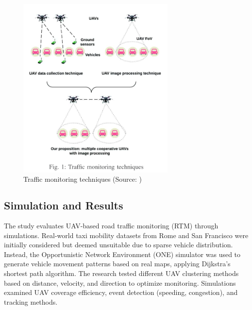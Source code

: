 \begin{figure}[H]
    \centering
    \includegraphics[width=0.7\textwidth]{Figures/Chapter3/Method4/3.png}
    \caption{Traffic monitoring techniques (Source: \cite{elloumi2018monitoring})}
    \label{fig:vehicular_mobility}
\end{figure}

\vspace{\baselineskip} %

\subsection{Simulation and Results}
The study evaluates UAV-based road traffic monitoring (RTM) through simulations. Real-world taxi mobility datasets from Rome and San Francisco were initially considered but deemed unsuitable due to sparse vehicle distribution. Instead, the Opportunistic Network Environment (ONE) simulator was used to generate vehicle movement patterns based on real maps, applying Dijkstra’s shortest path algorithm. The research tested different UAV clustering methods based on distance, velocity, and direction to optimize monitoring. Simulations examined UAV coverage efficiency, event detection (speeding, congestion), and tracking methods.

